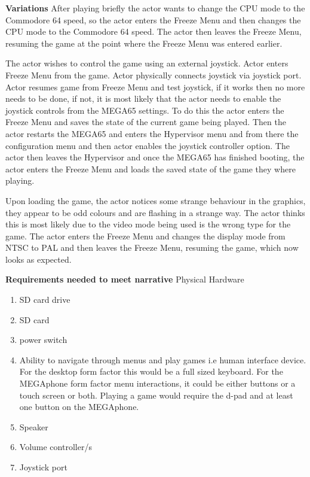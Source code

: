 \textbf{Variations}
After playing briefly the actor wants to change the CPU mode to the Commodore 64 speed, so the actor enters the Freeze Menu and then changes the CPU mode to the Commodore 64 speed. The actor then leaves the Freeze Menu, resuming the game at the point where the Freeze Menu was entered earlier. 

The actor wishes to control the game using an external joystick. Actor enters Freeze Menu from the game. Actor physically connects joystick via joystick port. Actor resumes game from Freeze Menu and test joystick, if it works then no more needs to be done, if not, it is most likely that the actor needs to enable the joystick controls from the MEGA65 settings. To do this the actor enters the Freeze Menu and saves the state of the current game being played. Then the actor restarts the MEGA65 and enters the Hypervisor menu and from there the configuration menu and then actor enables the joystick controller option. The actor then leaves the Hypervisor and once the MEGA65 has finished booting, the actor enters the Freeze Menu and loads the saved state of the game they where playing. 

Upon loading the game, the actor notices some strange behaviour in the graphics, they appear to be odd colours and are flashing in a strange way. The actor thinks this is most likely due to the video mode being used is the wrong type for the game. The actor enters the Freeze Menu and changes the display mode from NTSC to PAL and then leaves the Freeze Menu, resuming the game, which now looks as expected.

\textbf{Requirements needed to meet narrative}
Physical Hardware
\begin{enumerate}
\item SD card drive
\item SD card
\item power switch
\item Ability to navigate through menus and play games i.e human interface device. For the desktop form factor this would be a full sized keyboard. For the MEGAphone form factor menu interactions, it could be either buttons or a touch screen or both. Playing a game would require the d-pad and at least one button on the MEGAphone.
\item Speaker
\item Volume controller/s
\item Joystick port
\end{enumerate}

